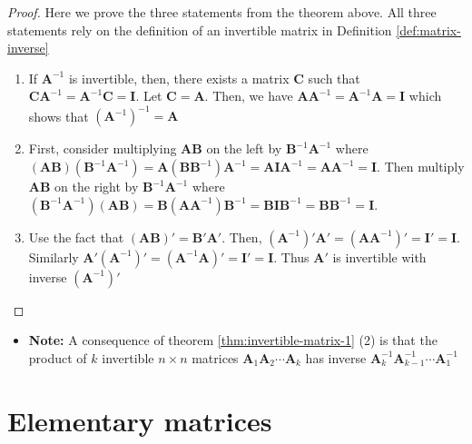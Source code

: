 \documentclass[
]{book}
\providecommand{\tightlist}{%
  \setlength{\itemsep}{0pt}\setlength{\parskip}{0pt}}
\theoremstyle{definition}
\theoremstyle{definition}
\theoremstyle{definition}
\theoremstyle{remark}
\begin{document}
\begin{proof}

Here we prove the three statements from the theorem above. All three statements rely on the definition of an invertible matrix in Definition \ref{def:matrix-inverse}

\begin{enumerate}
\def\labelenumi{\arabic{enumi})}
\item
  If \(\mathbf{A}^{-1}\) is invertible, then, there exists a matrix \(\mathbf{C}\) such that \(\mathbf{C} \mathbf{A}^{-1} = \mathbf{A}^{-1} \mathbf{C} = \mathbf{I}\). Let \(\mathbf{C} = \mathbf{A}\). Then, we have \(\mathbf{A} \mathbf{A}^{-1} = \mathbf{A}^{-1} \mathbf{A} = \mathbf{I}\) which shows that \(\left(\mathbf{A}^{-1}\right)^{-1} = \mathbf{A}\)
\item
  First, consider multiplying \(\mathbf{A}\mathbf{B}\) on the left by \(\mathbf{B}^{-1} \mathbf{A}^{-1}\) where \((\mathbf{A}\mathbf{B}) (\mathbf{B}^{-1} \mathbf{A}^{-1}) = \mathbf{A} (\mathbf{B} \mathbf{B}^{-1}) \mathbf{A}^{-1} = \mathbf{A} \mathbf{I} \mathbf{A}^{-1} = \mathbf{A} \mathbf{A}^{-1} = \mathbf{I}\). Then multiply \(\mathbf{A}\mathbf{B}\) on the right by \(\mathbf{B}^{-1} \mathbf{A}^{-1}\) where \((\mathbf{B}^{-1} \mathbf{A}^{-1}) (\mathbf{A}\mathbf{B}) = \mathbf{B} (\mathbf{A} \mathbf{A}^{-1}) \mathbf{B}^{-1} = \mathbf{B} \mathbf{I} \mathbf{B}^{-1} = \mathbf{B} \mathbf{B}^{-1} = \mathbf{I}\).
\item
  Use the fact that \((\mathbf{A} \mathbf{B})' = \mathbf{B}' \mathbf{A}'\). Then, \((\mathbf{A}^{-1})' \mathbf{A}' = (\mathbf{A}\mathbf{A}^{-1})' = \mathbf{I}' = \mathbf{I}\). Similarly \(\mathbf{A}'(\mathbf{A}^{-1})' = (\mathbf{A}^{-1}\mathbf{A})' = \mathbf{I}' = \mathbf{I}\). Thus \(\mathbf{A}'\) is invertible with inverse \((\mathbf{A}^{-1})'\)
\end{enumerate}

\end{proof}

\begin{itemize}
\tightlist
\item
  \textbf{Note:} A consequence of theorem \ref{thm:invertible-matrix-1} (2) is that the product of \(k\) invertible \(n \times n\) matrices \(\mathbf{A}_1 \mathbf{A}_2 \cdots \mathbf{A}_k\) has inverse \(\mathbf{A}_k^{-1} \mathbf{A}_{k-1}^{-1} \cdots \mathbf{A}_1^{-1}\)
\end{itemize}

\hypertarget{elementary-matrices}{%
\section{Elementary matrices}\label{elementary-matrices}}
\end{document}
